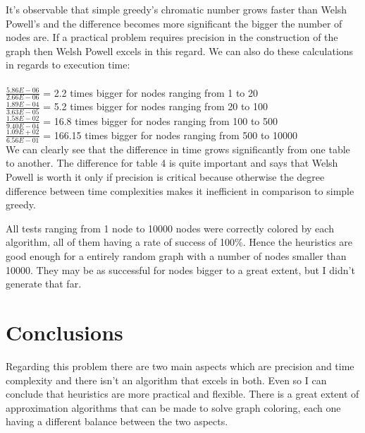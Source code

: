 \documentclass[runningheads]{llncs}
\begin{document}
It's observable that simple greedy's chromatic number grows faster than Welsh Powell's and
the difference becomes more significant the bigger the number of nodes are. If a practical
problem requires precision in the construction of the graph then Welsh Powell excels in
this regard. We can also do these calculations in regards to execution time:
\\
\\
\vspace{3pt}
\textbullet \hspace{1pt} $\frac{5.86E-06}{2.66E-06}$ = 2.2 times bigger for nodes ranging from 1 to 20 \\
\vspace{3pt}
\textbullet \hspace{1pt} $\frac{1.89E-04}{3.63E-05}$ = 5.2 times bigger for nodes ranging from 20 to 100 \\
\vspace{3pt}
\textbullet \hspace{1pt} $\frac{1.58E-02}{9.40E-04}$ = 16.8 times bigger for nodes ranging from 100 to 500 \\
\vspace{3pt}
\textbullet \hspace{1pt} $\frac{1.09E+02}{6.56E-01}$ = 166.15 times bigger for nodes ranging from 500 to 10000 \\

We can clearly see that the difference in time grows significantly from one table to another. The difference
for table 4 is quite important and says that Welsh Powell is worth it only if precision is critical because
otherwise the degree difference between time complexities makes it inefficient in comparison to simple greedy.

All tests ranging from 1 node to 10000 nodes were correctly colored by each algorithm, all of them having a rate of success of 100\%. Hence the heuristics are good enough for
a entirely random graph with a number of nodes smaller than 10000. They may be as successful
for nodes bigger to a great extent, but I didn't generate that far.

\section{Conclusions}

Regarding this problem there are two main aspects which are precision and time complexity and there isn't an algorithm
that excels in both. Even so I can conclude that heuristics are more practical and flexible. There is a great extent of
approximation algorithms that can be made to solve graph coloring, each one having a different balance between
the two aspects.
\end{document}
